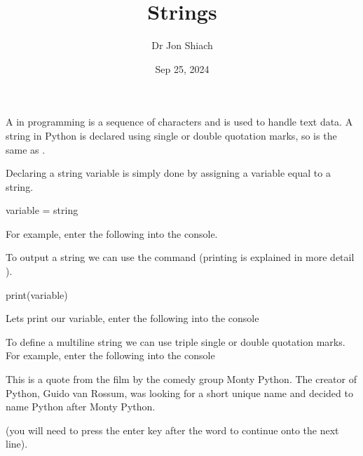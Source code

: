 \documentclass[letterpaper,10pt,english]{jupyterBook}
\title{Strings}
\date{Sep 25, 2024}
\author{Dr Jon Shiach}
\begin{document}
\pagestyle{empty}
\sphinxmaketitle
\pagestyle{plain}
\sphinxtableofcontents
\pagestyle{normal}
\label{\detokenize{_pages/1.3_Strings::doc}}


\sphinxAtStartPar
A  in programming is a sequence of characters and is used to handle text data. A string in Python is declared using single or double quotation marks, so  is the same as .

\sphinxAtStartPar
Declaring a string variable is simply done by assigning a variable equal to a string.

\begin{sphinxVerbatim}[commandchars=\\\{\}]
variable = \PYGZdq{}string\PYGZdq{}
\end{sphinxVerbatim}

\sphinxAtStartPar
For example, enter the following into the console.

\begin{sphinxVerbatim}[commandchars=\\\{\}]
 \PYG{p}{[}\PYG{p}{]}   
\end{sphinxVerbatim}

\sphinxAtStartPar
To output a string we can use the  command (printing is explained in more detail ).

\begin{sphinxVerbatim}[commandchars=\\\{\}]
print(variable)
\end{sphinxVerbatim}

\sphinxAtStartPar
Lets print our  variable, enter the following into the console

\begin{sphinxVerbatim}[commandchars=\\\{\}]
 \PYG{p}{[}\PYG{p}{]} 
\PYG{p}{[}\PYG{p}{]}  
\end{sphinxVerbatim}

\sphinxAtStartPar
To define a multiline string we can use triple single or double quotation marks. For example, enter the following into the console%
\begin{footnote}[1]\sphinxAtStartFootnote
This is a quote from the film  by the comedy group Monty Python. The creator of Python, Guido van Rossum, was looking for a short unique name and decided to name Python after Monty Python.
%
\end{footnote} (you will need to press the enter key after the word  to continue onto the next line).
\end{document}
